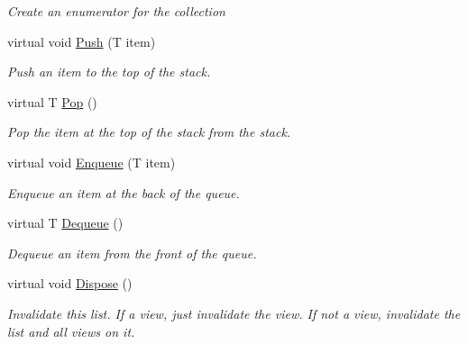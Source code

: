 \begin{DoxyCompactItemize}
\begin{DoxyCompactList}\small\item\em Create an enumerator for the collection \end{DoxyCompactList}\item 
virtual void \hyperlink{class_c5_1_1_array_list_a1eb4d5aadf670338e6402bf27fdc1b3a}{Push} (T item)
\begin{DoxyCompactList}\small\item\em Push an item to the top of the stack. \end{DoxyCompactList}\item 
virtual T \hyperlink{class_c5_1_1_array_list_aa9491c75f081e2680f2e9ad9a7875f7a}{Pop} ()
\begin{DoxyCompactList}\small\item\em Pop the item at the top of the stack from the stack. \end{DoxyCompactList}\item 
virtual void \hyperlink{class_c5_1_1_array_list_ac19b1fa4c34de8cf94afa85b325c5646}{Enqueue} (T item)
\begin{DoxyCompactList}\small\item\em Enqueue an item at the back of the queue. \end{DoxyCompactList}\item 
virtual T \hyperlink{class_c5_1_1_array_list_a82a4b5a21129d4cffe69fa53b9bfe827}{Dequeue} ()
\begin{DoxyCompactList}\small\item\em Dequeue an item from the front of the queue. \end{DoxyCompactList}\item 
virtual void \hyperlink{class_c5_1_1_array_list_a55ec641afe9eee899265a72119163e03}{Dispose} ()
\begin{DoxyCompactList}\small\item\em Invalidate this list. If a view, just invalidate the view. If not a view, invalidate the list and all views on it. \end{DoxyCompactList}\end{DoxyCompactItemize}
